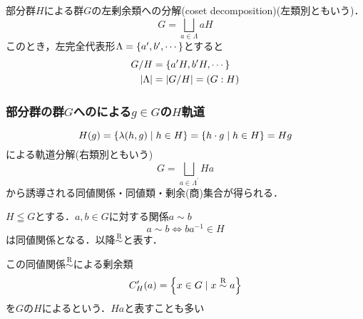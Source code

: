 \documentclass[main]{subfiles}
\begin{document}
			部分群$H$による群$G$の左剰余類への分解(coset decomposition)(左類別ともいう)．
			\[G=\bigsqcup_{a\in\Lambda}aH\]
			このとき，左完全代表形$\Lambda=\qty{a^\prime,b^\prime,\cdots}$とすると
			\begin{align*}
				G/H           & =\qty{a^\prime H,b^\prime H,\cdots } \\
				\qty|\Lambda| & =\qty|G/H|=\qty(G:H)
			\end{align*}
		\subsubsection{部分群の群$G$へのによる$g\in G$の$H$軌道}
			\[H\qty(g)=\qty{\lambda\qty(h,g)\mid h\in H}=\qty{h\cdot g\mid h\in H}=Hg\]
			による軌道分解(右類別ともいう)
			\[G=\bigsqcup_{a\in\Lambda^\prime}Ha\]
			から誘導される同値関係・同値類・剰余(商)集合が得られる．
			\begin{prop}
				$H\leqq G$とする．$a,b\in G$に対する関係$a\sim b$
				\[a\sim b\iff ba^{-1}\in H\]
				は同値関係となる．以降$\stackrel{\text{R}}{\sim}$と表す．
			\end{prop}
			この同値関係$\stackrel{\text{R}}{\sim}$による剰余類
			\[C^\prime_H\qty(a)=\qty{x\in G\mid x\stackrel{\text{R}}{\sim}a}\]
			を$G$の$H$によるという．$Ha$と表すことも多い
\end{document}
